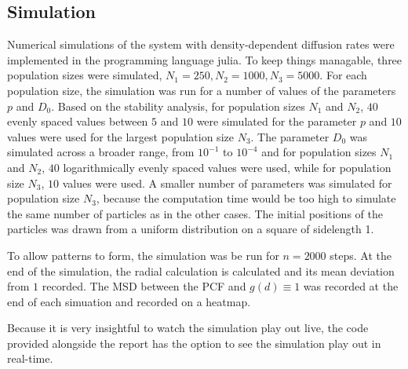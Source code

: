\documentclass{article}
\begin{document}
\subsection{Simulation}
Numerical simulations of the system with density-dependent diffusion rates were implemented in the programming language julia.
To keep things managable, three population sizes were simulated, $N_1=250, N_2 = 1000, N_3 = 5000$.
For each population size, the simulation was run for a number of values of the parameters $p$ and $D_0$.
Based on the stability analysis, for population sizes $N_1$ and $N_2$, $40$ evenly spaced values between $5$ and $10$ were simulated for the parameter $p$ and $10$ values were used for the largest population size $N_3$.
The parameter $D_0$ was simulated across a broader range, from $10^{-1}$ to $10^{-4}$ and for population sizes $N_1$ and $N_2$, $40$ logarithmically evenly spaced values were used, while for population size $N_3$, $10$ values were used.
A smaller number of parameters was simulated for population size $N_3$, because the computation time would be too high to simulate the same number of particles as in the other cases.
The initial positions of the particles was drawn from a uniform distribution on a square of sidelength 1.

To allow patterns to form, the simulation was be run for $n=2000$ steps. 
At the end of the simulation, the radial calculation is calculated and its mean deviation from $1$ recorded. 
The MSD between the PCF and $g(d) \equiv 1$ was recorded at the end of each simuation and recorded on a heatmap.

Because it is very insightful to watch the simulation play out live, the code provided alongside the report has the option to see the simulation play out in real-time.
\end{document}
